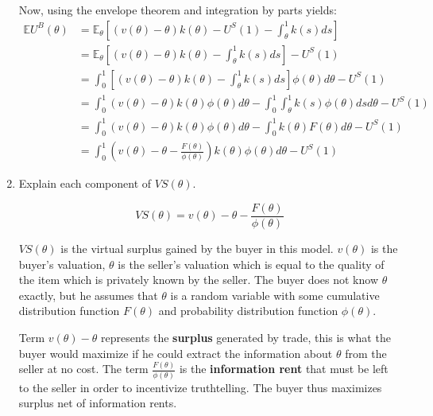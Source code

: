 \documentclass[a4paper]{article}
\begin{document}
\begin{enumerate}
	Now, using the envelope theorem and integration by parts yields:
	\begin{align*}
		\mathbb{E}U^B(\theta) &=\mathbb{E}_\theta[(v(\theta)-\theta)k(\theta)-U^S(1)-\int_\theta^1k(s)ds]
		\\
		&=\mathbb{E}_\theta[(v(\theta)-\theta)k(\theta)-\int_\theta^1k(s)ds]-U^S(1)
		\\
		&=\int_0^1 \left[(v(\theta)-\theta)k(\theta)-\int_\theta^1k(s)ds \right] \phi(\theta)d\theta-U^S(1)
		\\
		&=\int_0^1(v(\theta)-\theta)k(\theta)\phi(\theta)d\theta  -\int_0^1\int_\theta^1k(s) \phi(\theta) ds d\theta-U^S(1)
		\\
		&=\int_0^1(v(\theta)-\theta)k(\theta)\phi(\theta)d\theta-\int_0^1 k(\theta) F(\theta) d\theta -U^{S}(1)
		\\
		&=\int_0^1 \left(v(\theta)-\theta-\frac{F(\theta)}{\phi(\theta)} \right) k(\theta)\phi(\theta)d\theta -U^S(1)
	\end{align*}
	
	
	\item 
	Explain each component of $VS(\theta)$.
	
	$$ VS(\theta)=v(\theta)-\theta-\frac{F(\theta)}{\phi(\theta)} $$
	
	$VS(\theta)$ is the virtual surplus gained by the buyer in this model. $v(\theta)$ is the buyer's valuation, $\theta$ is the seller's valuation which is equal to the quality of the item which is privately known by the seller. The buyer does not know $\theta$ exactly, but he assumes that $\theta$ is a random variable with some cumulative distribution function $F(\theta)$ and probability distribution function $\phi(\theta)$.
	
	Term $v(\theta) - \theta$ represents the \textbf{surplus} generated by trade, this is what the buyer would maximize if he could extract the information about $\theta$ from the seller at no cost. The term $\frac{F(\theta)}{\phi(\theta)}$ is the \textbf{information rent} that must be left to the seller in order to incentivize truthtelling. The buyer thus maximizes surplus net of information rents.
	

\end{enumerate}
\end{document}
